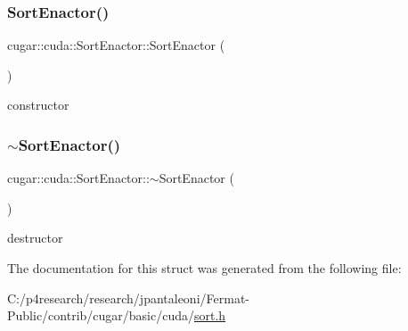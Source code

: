 \subsubsection{\texorpdfstring{Sort\+Enactor()}{SortEnactor()}}
{\footnotesize\ttfamily cugar\+::cuda\+::\+Sort\+Enactor\+::\+Sort\+Enactor (\begin{DoxyParamCaption}{ }\end{DoxyParamCaption})}

constructor \mbox{\label{structcugar_1_1cuda_1_1_sort_enactor_abf18529a97f46aefeea4c9056118e6bf}} 
\subsubsection{\texorpdfstring{$\sim$\+Sort\+Enactor()}{~SortEnactor()}}
{\footnotesize\ttfamily cugar\+::cuda\+::\+Sort\+Enactor\+::$\sim$\+Sort\+Enactor (\begin{DoxyParamCaption}{ }\end{DoxyParamCaption})}

destructor 

The documentation for this struct was generated from the following file\+:\begin{DoxyCompactItemize}
\item 
C\+:/p4research/research/jpantaleoni/\+Fermat-\/\+Public/contrib/cugar/basic/cuda/\hyperlink{sort_8h}{sort.\+h}\end{DoxyCompactItemize}
